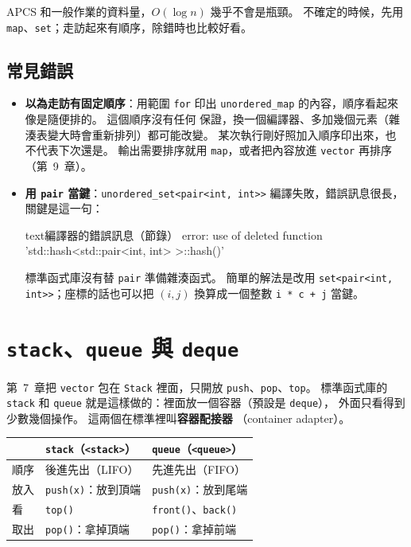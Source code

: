 APCS 和一般作業的資料量，$O(\log n)$ 幾乎不會是瓶頸。 不確定的時候，先用
\texttt{map}、\texttt{set}；走訪起來有順序，除錯時也比較好看。

\subsection{常見錯誤}

\begin{itemize}
\item \textbf{以為走訪有固定順序}：用範圍 \texttt{for} 印出
\texttt{unordered\_map} 的內容，順序看起來像是隨便排的。 這個順序沒有任何
保證，換一個編譯器、多加幾個元素（雜湊表變大時會重新排列）都可能改變。
某次執行剛好照加入順序印出來，也不代表下次還是。 輸出需要排序就用
\texttt{map}，或者把內容放進 \texttt{vector} 再排序（第~9~章）。
\item \textbf{用 \texttt{pair} 當鍵}：\texttt{unordered\_set<pair<int,
int>>} 編譯失敗，錯誤訊息很長，關鍵是這一句：
\begin{code}{text}{編譯器的錯誤訊息（節錄）}
error: use of deleted function 'std::hash<std::pair<int, int> >::hash()'
\end{code}
標準函式庫沒有替 \texttt{pair} 準備雜湊函式。 簡單的解法是改用
\texttt{set<pair<int, int>>}；座標的話也可以把 $(i, j)$ 換算成一個整數
\texttt{i * c + j} 當鍵。
\end{itemize}

\section{\texttt{stack}、\texttt{queue} 與 \texttt{deque}}
\label{sec:stack-queue}

第~7~章把 \texttt{vector} 包在 \texttt{Stack} 裡面，只開放
\texttt{push}、\texttt{pop}、\texttt{top}。 標準函式庫的 \texttt{stack}
和 \texttt{queue} 就是這樣做的：裡面放一個容器（預設是 \texttt{deque}），
外面只看得到少數幾個操作。 這兩個在標準裡叫\textbf{容器配接器}
（container adapter）。

\begin{center}
\begin{tabular}{lll}
\toprule
& \texttt{stack}（\texttt{<stack>}） & \texttt{queue}（\texttt{<queue>}） \\
\midrule
順序 & 後進先出（LIFO） & 先進先出（FIFO） \\
放入 & \texttt{push(x)}：放到頂端 & \texttt{push(x)}：放到尾端 \\
看 & \texttt{top()} & \texttt{front()}、\texttt{back()} \\
取出 & \texttt{pop()}：拿掉頂端 & \texttt{pop()}：拿掉前端 \\
\bottomrule
\end{tabular}
\end{center}

